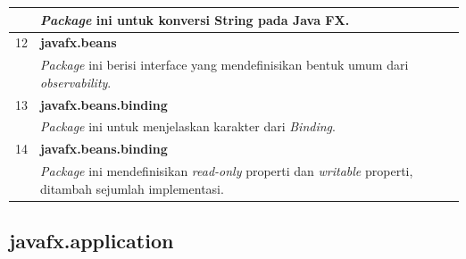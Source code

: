 \begin{tabular}{|c|p{12cm}|}
			&	\textit{Package} ini untuk konversi String pada Java FX.\\ \hline
		12 & \textbf{javafx.beans}\\
			&	\textit{Package} ini berisi interface yang mendefinisikan bentuk umum dari \textit{observability}.\\ \hline
		13 & \textbf{javafx.beans.binding}\\
			&	\textit{Package} ini untuk menjelaskan karakter dari \textit{Binding}.\\ \hline	
		14 & \textbf{javafx.beans.binding}\\
			&	\textit{Package} ini mendefinisikan \textit{read-only} properti dan \textit{writable} properti, ditambah sejumlah implementasi.\\ \hline		
	\end{tabular}

\subsection{javafx.application}
\textbf{}